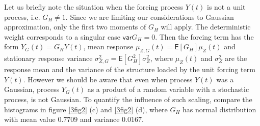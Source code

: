 \documentclass[preprint,12pt,authoryear]{elsarticle}
\begin{document}
Let us briefly note the situation when the forcing process $Y(t)$ is not a unit process, i.e. $G_H\neq 1$. Since we are limiting our considerations to Gaussian approximation, only the first two moments of $G_H$ will apply. The deterministic weight corresponds to a singular case $\mathsf{var}G_H=0$. Then the forcing term has the form $Y_G(t)=G_HY(t)$, mean response $\mu_{Z,G}(t)=\mathsf{E}[G_H]\mu_Z(t)$ and stationary response variance $\sigma_{Z,G}^2=\mathsf{E}[G_H^2]\sigma_Z^2$, where $\mu_Z(t)$ and $\sigma_Z^2$ are the response mean and the variance of the structure loaded by the unit forcing term $Y(t)$. However we should be aware that even when process $Y(t)$ was a Gaussian, process $Y_G(t)$ as a product of a random variable with a stochastic process, is not Gaussian. To quantify the influence of such scaling, compare the histograms in figure \ref{3fig2} (c) and \ref{3fig2} (d), where $G_H$ has normal distribution with mean value $0.7709$ and variance $0.0167$.
\end{document}
